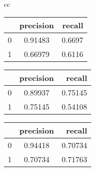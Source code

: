 \begin{tabular}{cc} 
    \begin{minipage}{0.33\textwidth}
        \begin{center}
            \begin{tabular}{ | l | c | r | }
              \hline
               & precision & recall \\ \hline
              0 & 0.91483 & 0.6697 \\ \hline
              1 & 0.66979 & 0.6116 \\
              \hline
            \end{tabular}
        \end{center}
    \end{minipage}

    \begin{minipage}{0.33\textwidth}
        \begin{center}
            \begin{tabular}{ | l | c | r | }
              \hline
               & precision & recall \\ \hline
              0 & 0.89937 & 0.75145 \\ \hline
              1 & 0.75145 & 0.54108 \\
              \hline
            \end{tabular}
        \end{center}
    \end{minipage}

    \begin{minipage}{0.33\textwidth}
        \begin{center}
            \begin{tabular}{ | l | c | r | }
              \hline
               & precision & recall \\ \hline
              0 & 0.94418 & 0.70734 \\ \hline
              1 & 0.70734 & 0.71763 \\
              \hline
            \end{tabular}
        \end{center}
    \end{minipage}
\end{tabular}


